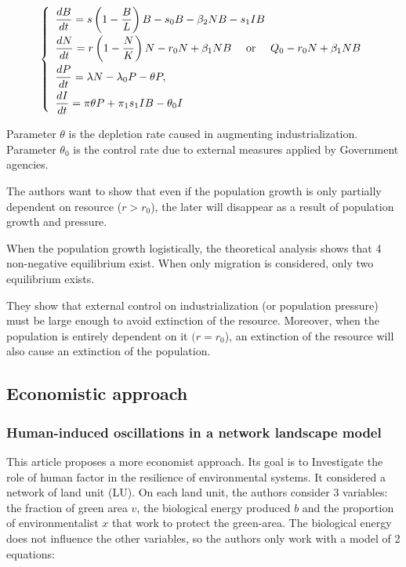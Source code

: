 \documentclass{article}
\begin{document}
\begin{equation}
\def\arraystretch{2}
\left\lbrace \begin{array}{l}
\dfrac{dB}{dt} = s\left(1 - \dfrac{B}{L} \right)B - s_0 B - \beta_2 NB - s_1 IB \\
\dfrac{dN}{dt} = r\left(1 - \dfrac{N}{K} \right)N - r_0N + \beta_1 NB \quad \text{ or } \quad Q_0 - r_0N + \beta_1 NB \\
\dfrac{dP}{dt} = \lambda N - \lambda_0 P - \theta P, \\
\dfrac{dI}{dt} = \pi \theta P + \pi_1 s_1 IB  - \theta_0 I
\end{array} \right.
\end{equation}

Parameter $\theta$ is the depletion rate caused in augmenting industrialization. Parameter $ \theta_0 $ is the control rate due to external measures applied by Government agencies.

The authors want to show that even if the population growth is only partially dependent on resource ($r > r_0$), the later will disappear as a result of population growth and pressure.

When the population growth logistically, the theoretical analysis shows that 4 non-negative equilibrium exist. When only migration is considered, only two equilibrium exists.

They show that external control on industrialization (or population pressure) must be large enough to avoid extinction of the resource. Moreover, when the population is entirely dependent on it $(r = r_0$), an extinction of the resource will also cause an extinction of the population.




\subsection{Economistic approach}

\subsubsection{Human-induced oscillations in a network landscape model \cite{della_marca_human-induced_2022}}

This article proposes a more economist approach. Its goal is to Investigate the role of human factor in the resilience of environmental systems. It considered a network of land unit (LU). On each land unit, the authors consider 3 variables: the fraction of green area $v$, the biological energy produced $b$ and the proportion of environmentalist $x$ that work to protect the green-area. The biological energy does not influence the other variables, so the authors only work with a model of 2 equations: 
\end{document}
